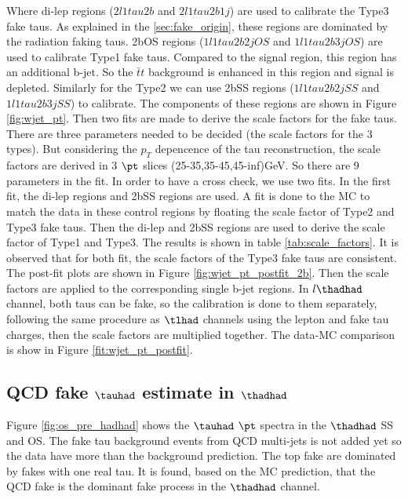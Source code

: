 Where di-lep regions ($2l1tau2b$ and $2l1tau2b1j$) are used to calibrate the Type3 fake taus. As explained in the \ref{sec:fake_origin}, these regions are dominated by the radiation faking taus. 2bOS regions ($1l1tau2b2j OS$ and $1l1tau2b3j OS$) are used to calibrate Type1 fake taus. Compared to the signal region, this region has an additional b-jet. So the $\bar{t}t$ background is enhanced in this region and signal is depleted. Similarly for the Type2 we can use 2bSS regions ($1l1tau2b2j SS$
and $1l1tau2b3j SS$) to calibrate. The components of these regions are shown in Figure \ref{fig:wjet_pt}. Then two fits are made to derive the scale factors for the fake taus. There are three parameters needed to be decided (the scale factors for the 3 types). But considering the $p_{T}$ depencence of the tau reconstruction, the scale factors are derived in 3 $\pt$ slices (25-35,35-45,45-inf)GeV. So there are 9 parameters in the fit. In order to have a cross check, we use two fits. In the first fit, the di-lep regions and 2bSS regions are used. A fit is done to the MC to match the data in these control regions by floating the scale factor of Type2 and Type3 fake taus. Then the di-lep and 2bSS regions are used to derive the scale factor of Type1 and Type3. The results is shown in table \ref{tab:scale_factors}. It is observed that for both fit, the scale factors of the Type3 fake taus are consistent. The post-fit plots are shown in Figure \ref{fig:wjet_pt_postfit_2b}. Then the scale factors are applied to the corresponding single b-jet regions. In $l\thadhad$ channel, both taus can be fake, so the calibration is done to them separately, following the same procedure as $\tlhad$ channels using the lepton and fake tau charges, then the scale factors are multiplied together. The data-MC comparison is show in Figure \ref{fit:wjet_pt_postfit}.




\subsection{QCD fake $\tauhad$ estimate in $\thadhad$}
\label{sec:ss_method}

Figure \ref{fig:os_pre_hadhad} shows the $\tauhad$ $\pt$ spectra in the $\thadhad$ SS and OS. The fake tau background events from QCD multi-jets 
is not added yet so the data have more than the background prediction. The top fake are dominated by fakes with one real tau.
It is found, based on the MC prediction, that the QCD fake is the dominant fake process in the $\thadhad$ channel.

